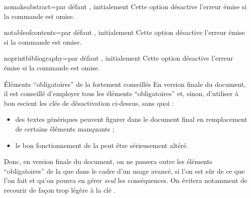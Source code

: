 \begin{description}
\begin{docKey}{nomakeabstract}{=\textbar{}}{par
    défaut , initialement }
  Cette option désactive l'erreur émise si la commande 
  est omise.
\end{docKey}
\begin{docKey}{notableofcontents}{=\textbar{}}{par
    défaut , initialement }
  Cette option désactive l'erreur émise si la commande 
  est omise.
\end{docKey}
\begin{docKey}{noprintbibliography}{=\textbar{}}{par
    défaut , initialement }
  Cette option désactive l'erreur émise si la commande
   est omise.
\end{docKey}
\end{description}

\begin{dbwarning}{Éléments \enquote{obligatoires} de la \yatcl{}
    fortement conseillés}{}
  En version finale du document, il est conseillé d'employer tous les éléments
  \enquote{obligatoires} et, sinon, d'utiliser à bon escient les clés de
  désactivation ci-dessus, sans quoi :
  \begin{itemize}
  \item des textes génériques peuvent figurer dans le document final en
    remplacement de certains éléments manquants ;
  \item le bon fonctionnement de la \yatcl{} peut être sérieusement altéré.
  \end{itemize}
  Donc, en version finale du document, on ne passera outre les éléments
  \enquote{obligatoires} de la \yatcl{} que dans le cadre d'un usage avancé, si
  l'on est sûr de ce que l'on fait et qu'on pourra en gérer \emph{seul} les
  conséquences.  On évitera notamment de recourir de façon trop légère à la clé
  .
\end{dbwarning}

%
\iffalse
\fi
